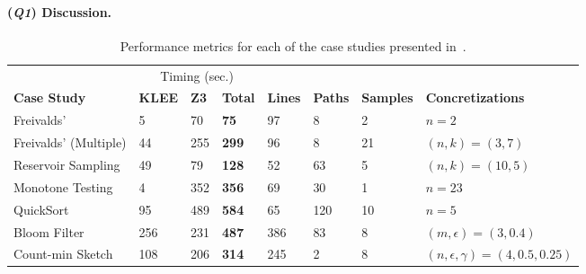 \documentclass[acmsmall,review,anonymous]{acmart}\settopmatter{printfolios=true,printccs=false,printacmref=false}
\newcommand{\Q}[1]{(\textit{\textbf{Q#1}})}
\begin{document}
\paragraph*{\Q{1} Discussion.}
\begin{table}
  \centering
  \caption{Performance metrics for each of the case studies presented in~.}
  \label{tab:q1}
  \begin{tabular}{@{}llllllll@{}}
    \toprule
    & \multicolumn{3}{c}{Timing (sec.)} &&\\ \cmidrule{2-4}
    \textbf{Case Study} & \textbf{KLEE} & \textbf{Z3} & \textbf{Total} & \textbf{Lines} & \textbf{Paths} & \textbf{Samples} & \textbf{Concretizations}\\ \midrule
    Freivalds' & 5 & 70 & \textbf{75} & 97 & 8 & 2 & $n=2$ \\
    Freivalds' (Multiple) & 44 & 255 & \textbf{299} & 96 & 8 & 21 & $(n, k) = (3, 7)$ \\
    Reservoir Sampling & 49 & 79 & \textbf{128} & 52 & 63 & 5 & $(n, k) = (10, 5)$ \\
    Monotone Testing & 4 & 352 & \textbf{356} & 69 & 30 & 1 & $n=23$ \\
    QuickSort & 95 & 489 & \textbf{584} & 65 & 120 & 10 & $n=5$ \\
    Bloom Filter & 256 & 231 & \textbf{487} & 386 & 83 & 8 & $(m, \epsilon) = (3, 0.4)$ \\
    Count-min Sketch & 108 & 206 & \textbf{314} & 245 & 2 & 8 & $(n, \epsilon, \gamma) = (4, 0.5, 0.25)$ \\


\end{tabular}
\end{table}
\end{document}
